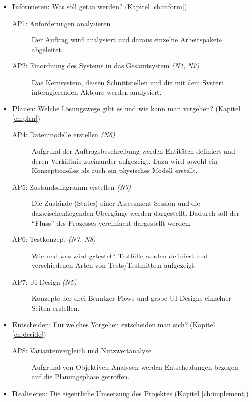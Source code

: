 \begin{itemize}
    \item \textbf{I}nformieren: Was soll getan werden? (\hyperref[ch:inform]{Kapitel \ref*{ch:inform}})
          \begin{description}
              \item[AP1: Anforderungen analysieren] Der Auftrag wird analysiert und daraus einzelne Arbeitspakete abgeleitet.
              \item[AP2: Einordnung des Systems in das Gesamtsystem {\normalfont\emph{(N1, N2)}}] Das Kernsystem, dessen Schnittstellen und die mit dem System interagierenden Akteure werden analysiert.
          \end{description}
    \item \textbf{P}lanen: Welche Lösungswege gibt es und wie kann man vorgehen? (\hyperref[ch:plan]{Kapitel \ref*{ch:plan}})
          \begin{description}
              \item[AP4: Datenmodelle erstellen {\normalfont\emph{(N6)}}] Aufgrund der Auftragsbeschreibung werden Entitäten definiert und deren Verhältnis zueinander aufgezeigt. Dazu wird sowohl ein Konzeptionelles als auch ein physisches Modell erstellt.
              \item[AP5: Zustandsdiagramm erstellen {\normalfont\emph{(N6)}}] Die Zustände (States) einer Assessment-Session und die dazwischenliegenden Übergänge werden dargestellt. Dadurch soll der \enquote{Fluss} des Prozesses vereinfacht dargestellt werden.
              \item[AP6: Testkonzept {\normalfont\emph{(N7, N8)}}] Wie und was wird getestet? Testfälle werden definiert und verschiedenen Arten von Tests/Testmitteln aufgezeigt.
              \item[AP7: UI-Design {\normalfont\emph{(N5)}}] Konzepte der drei Benutzer-Flows und grobe UI-Designs einzelner Seiten erstellen.
          \end{description}
    \item \textbf{E}ntscheiden: Für welches Vorgehen entscheiden man sich? (\hyperref[ch:decide]{Kapitel \ref*{ch:decide}})
          \begin{description}
              \item[AP8: Variantenvergleich und Nutzwertanalyse] Aufgrund von Objektiven Analysen werden Entscheidungen bezogen auf die Planungsphase getroffen.
          \end{description}
    \item \textbf{R}ealisieren: Die eigentliche Umsetzung des Projektes (\hyperref[ch:implement]{Kapitel \ref*{ch:implement}})

\end{itemize}
